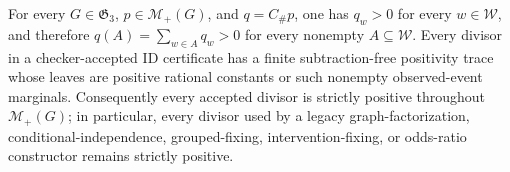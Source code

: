 For every \(G\in\mathfrak G_3\), \(p\in\mathcal M_+(G)\), and \(q=C_{\#}p\), one has \(q_w>0\) for every \(w\in\mathcal W\), and therefore \(q(A)=\sum_{w\in A}q_w>0\) for every nonempty \(A\subseteq\mathcal W\). Every divisor in a checker-accepted \(\mathrm{ID}\) certificate has a finite subtraction-free positivity trace whose leaves are positive rational constants or such nonempty observed-event marginals. Consequently every accepted divisor is strictly positive throughout \(\mathcal M_+(G)\); in particular, every divisor used by a legacy graph-factorization, conditional-independence, grouped-fixing, intervention-fixing, or odds-ratio constructor remains strictly positive.